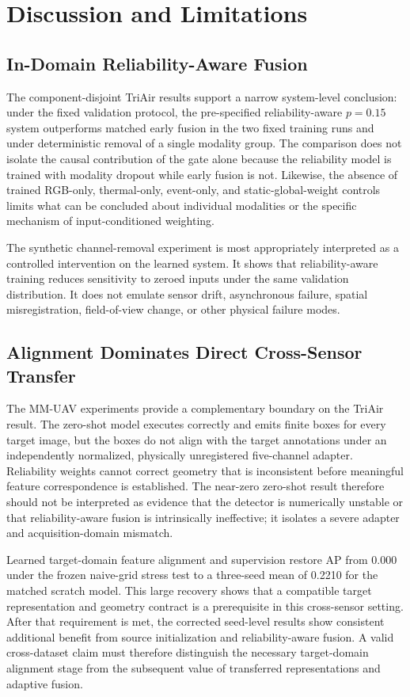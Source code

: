 \section{Discussion and Limitations}
\subsection{In-Domain Reliability-Aware Fusion}
The component-disjoint TriAir results support a narrow system-level conclusion: under the fixed validation protocol, the pre-specified reliability-aware $p=0.15$ system outperforms matched early fusion in the two fixed training runs and under deterministic removal of a single modality group. The comparison does not isolate the causal contribution of the gate alone because the reliability model is trained with modality dropout while early fusion is not. Likewise, the absence of trained RGB-only, thermal-only, event-only, and static-global-weight controls limits what can be concluded about individual modalities or the specific mechanism of input-conditioned weighting.

The synthetic channel-removal experiment is most appropriately interpreted as a controlled intervention on the learned system. It shows that reliability-aware training reduces sensitivity to zeroed inputs under the same validation distribution. It does not emulate sensor drift, asynchronous failure, spatial misregistration, field-of-view change, or other physical failure modes.

\subsection{Alignment Dominates Direct Cross-Sensor Transfer}
The MM-UAV experiments provide a complementary boundary on the TriAir result. The zero-shot model executes correctly and emits finite boxes for every target image, but the boxes do not align with the target annotations under an independently normalized, physically unregistered five-channel adapter. Reliability weights cannot correct geometry that is inconsistent before meaningful feature correspondence is established. The near-zero zero-shot result therefore should not be interpreted as evidence that the detector is numerically unstable or that reliability-aware fusion is intrinsically ineffective; it isolates a severe adapter and acquisition-domain mismatch.

Learned target-domain feature alignment and supervision restore AP from 0.000 under the frozen naive-grid stress test to a three-seed mean of 0.2210 for the matched scratch model. This large recovery shows that a compatible target representation and geometry contract is a prerequisite in this cross-sensor setting. After that requirement is met, the corrected seed-level results show consistent additional benefit from source initialization and reliability-aware fusion. A valid cross-dataset claim must therefore distinguish the necessary target-domain alignment stage from the subsequent value of transferred representations and adaptive fusion.

